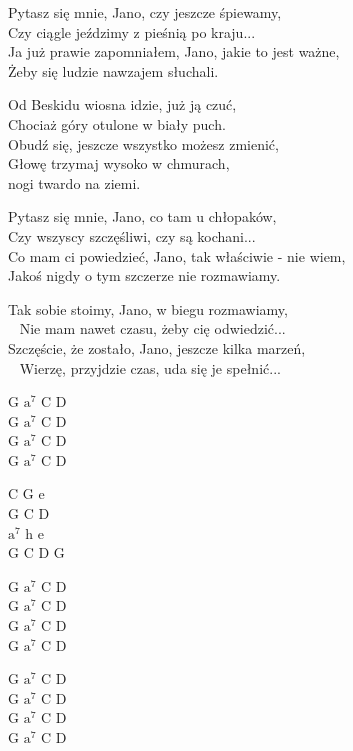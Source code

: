 \begin{text}
Pytasz się mnie, Jano, czy jeszcze śpiewamy, \\
Czy ciągle jeździmy z pieśnią po kraju... \\
Ja już prawie zapomniałem, Jano, jakie to jest ważne, \\
Żeby się ludzie nawzajem słuchali.

\vin Od Beskidu wiosna idzie, już ją czuć, \\
\vin Chociaż góry otulone w biały puch. \\
\vin Obudź się, jeszcze wszystko możesz zmienić,\\
\vin Głowę trzymaj wysoko w chmurach,\\
\vin\vin\vin\vin nogi twardo na ziemi. 

Pytasz się mnie, Jano, co tam u chłopaków, \\
Czy wszyscy szczęśliwi, czy są kochani... \\
Co mam ci powiedzieć, Jano, tak właściwie - nie wiem, \\
Jakoś nigdy o tym szczerze nie rozmawiamy. 

Tak sobie stoimy, Jano, w biegu rozmawiamy,\\ 
Nie mam nawet czasu, żeby cię odwiedzić... \\
Szczęście, że zostało, Jano, jeszcze kilka marzeń,\\ 
Wierzę, przyjdzie czas, uda się je spełnić... 
\end{text}
\begin{chord}
G $\mathrm{a^7}$ C D\\
G $\mathrm{a^7}$ C D\\
G $\mathrm{a^7}$ C D\\
G $\mathrm{a^7}$ C D

C G e\\
G C D\\
$\mathrm{a^7}$ h e\\
G C D G

\hfill\break
G $\mathrm{a^7}$ C D\\
G $\mathrm{a^7}$ C D\\
G $\mathrm{a^7}$ C D\\
G $\mathrm{a^7}$ C D

G $\mathrm{a^7}$ C D\\
G $\mathrm{a^7}$ C D\\
G $\mathrm{a^7}$ C D\\
G $\mathrm{a^7}$ C D
\end{chord}

